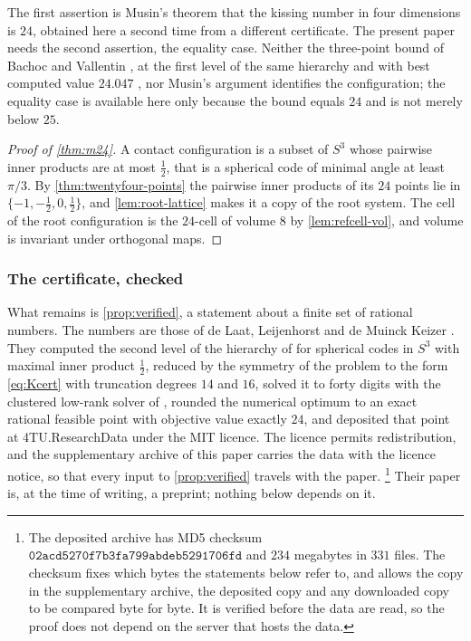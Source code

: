 \documentclass[11pt,reqno]{amsart}
\renewcommand{\_}{\origunderscore\allowbreak}
\numberwithin{equation}{section}
\theoremstyle{plain}
\theoremstyle{definition}
\theoremstyle{remark}
\begin{document}
The first assertion is Musin's theorem \cite{Mus08} that the kissing
number in four dimensions is $24$, obtained here a second time from a
different certificate. The present paper needs the second assertion,
the equality case. Neither the three-point bound of Bachoc and Vallentin
\cite{BV08}, at the first level of the same hierarchy and with best
computed value $24.047$ \cite{Lei25}, nor Musin's argument identifies the
configuration; the equality case is available here only because the
bound equals $24$ and is not merely below $25$.

\begin{proof}[Proof of \cref{thm:m24}]
A contact configuration is a subset of $S^3$ whose pairwise inner
products are at most $\tfrac12$, that is a spherical code of minimal
angle at least $\pi/3$. By \cref{thm:twentyfour-points} the pairwise
inner products of its $24$ points lie in $\{-1,-\tfrac12,0,\tfrac12\}$, and
\cref{lem:root-lattice} makes it a copy of the root system. The cell of
the root configuration is the $24$-cell of volume $8$ by
\cref{lem:refcell-vol}, and volume is invariant under orthogonal maps.
\end{proof}

\subsubsection{The certificate, checked}
\label{sec:certificate-checked}

What remains is \cref{prop:verified}, a statement about a finite set of
rational numbers. The numbers are those of de Laat, Leijenhorst and de
Muinck Keizer \cite{LLM24}. They computed the second level of the
hierarchy of \cite{dLV15} for spherical codes in $S^3$ with maximal
inner product $\tfrac12$, reduced by the symmetry of the problem to the
form \eqref{eq:Kcert} with truncation degrees $14$ and $16$, solved it
to forty digits with the clustered low-rank solver of \cite{LdL24},
rounded the numerical optimum to an exact rational feasible point with
objective value exactly $24$, and deposited that point at
4TU.ResearchData \cite{LLM24data} under the MIT licence. The licence
permits redistribution, and the supplementary archive of this paper
\cite{D4Zenodo} carries the data with the licence notice, so that every
input to \cref{prop:verified} travels with the paper.%
\footnote{The deposited archive has MD5 checksum
  $\mathtt{02acd5270f7b3fa799abdeb5291706fd}$ and $234$ megabytes in
  $331$ files. The checksum fixes which bytes the statements below refer
  to, and allows the copy in the supplementary archive, the deposited
  copy and any downloaded copy to be compared byte for byte. It is
  verified before the data are read, so the proof does not depend on the
  server that hosts the data.}
Their paper is, at the time of writing, a preprint; nothing below
depends on it.
\end{document}
